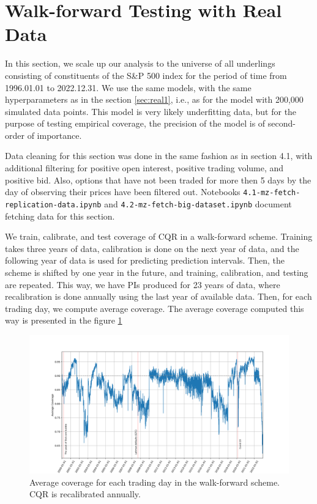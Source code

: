 \documentclass{article}
\theoremstyle{definition}
\begin{document}
\section{Walk-forward Testing with Real Data}

In this section, we scale up our analysis to the universe of all underlings consisting of constituents of the S\&P 500 index for the period of time from 1996.01.01 to 2022.12.31. We use the same models, with the same hyperparameters as in the section \ref{sec:real1}, i.e., as for the model with 200,000 simulated data points. This model is very likely underfitting data, but for the purpose of testing empirical coverage, the precision of the model is of second-order of importance.

Data cleaning for this section was done in the same fashion as in section 4.1, with additional filtering for positive open interest, positive trading volume, and positive bid. Also, options that have not been traded for more then 5 days by the day of observing their prices have been filtered out. Notebooks \texttt{4.1-mz-fetch-replication-data.ipynb} and \texttt{4.2-mz-fetch-big-dataset.ipynb} document fetching data for this section.

We train, calibrate, and test coverage of CQR in a walk-forward scheme. Training takes three years of data, calibration is done on the next year of data, and the following year of data is used for predicting prediction intervals. Then, the scheme is shifted by one year in the future, and training, calibration, and testing are repeated. This way, we have PIs produced for 23 years of data, where recalibration is done annually using the last year of available data. Then, for each trading day, we compute average coverage. The average coverage computed this way is presented in the figure \ref{fig:real2_average_coverage.png}   


\begin{figure}[H]
    \center 
    \includegraphics[width=1.1\textwidth]{reports/figures/real_data_walk_fwd/average_coverage.png}
    \caption{Average coverage for each trading day in the walk-forward scheme. CQR is recalibrated annually.}
    \label{fig:real2_average_coverage.png}
\end{figure}
\end{document}
